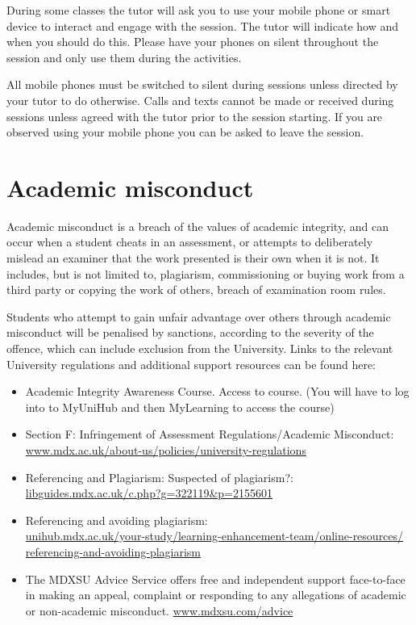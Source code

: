 \documentclass{MDXHandbook}
\begin{document}
During some classes the tutor will ask you to use your mobile phone or smart device to interact and engage with the session. The tutor will indicate how and when you should do this. Please have your phones on silent throughout the session and only use them during the activities.


All mobile phones must be switched to silent during sessions unless directed by your tutor to do otherwise.  Calls and texts cannot be made or received during sessions unless agreed with the tutor prior to the session starting.  If you are observed using your mobile phone you can be asked to leave the session.  

\section*{Academic misconduct}
Academic misconduct is a breach of the values of academic integrity, and can occur when a student cheats in an assessment, or attempts to deliberately mislead an examiner that the work presented is their own when it is not. It includes, but is not limited to, plagiarism, commissioning or buying work from a third party or copying the work of others, breach of examination room rules.

Students who attempt to gain unfair advantage over others through academic misconduct  will be penalised by sanctions, according to the severity of the offence, which can include exclusion from the University. Links to the relevant University regulations and additional support resources can be found here: 
\begin{itemize}
	\item Academic Integrity Awareness Course. Access to course. (You will have to log into to MyUniHub and then MyLearning to access the course)
	\item Section F: Infringement of Assessment Regulations/Academic Misconduct:\\
		\url{www.mdx.ac.uk/about-us/policies/university-regulations}
	\item Referencing and Plagiarism: Suspected of plagiarism?:\\
		\url{libguides.mdx.ac.uk/c.php?g=322119&p=2155601}
	\item Referencing and avoiding plagiarism:\\
		\href{unihub.mdx.ac.uk/your-study/learning-enhancement-team/online-resources/referencing-and-avoiding-plagiarism}{\url{unihub.mdx.ac.uk/your-study/learning-enhancement-team/online-resources/}\\ \url{referencing-and-avoiding-plagiarism}}
	\item The MDXSU Advice Service offers free and independent support face-to-face in making an appeal, complaint or responding to any allegations of academic or non-academic misconduct. 
		\url{www.mdxsu.com/advice}
\end{itemize}
\end{document}
